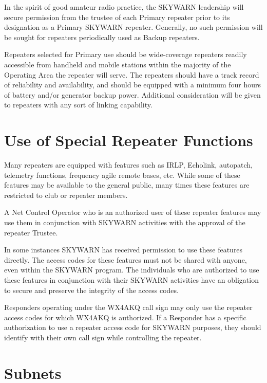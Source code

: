 \documentclass[pdflatex,letterpaper,twoside,12pt]{book}
\begin{document}
In the spirit of good amateur radio practice, the SKYWARN leadership will secure permission from the trustee of each Primary repeater prior to its designation as a Primary SKYWARN repeater.  Generally, no such permission will be sought for repeaters periodically used as Backup repeaters. 

Repeaters selected for Primary use should be wide-coverage repeaters readily accessible from handheld and mobile stations within the majority of the Operating Area the repeater will serve.  The repeaters should have a track record of reliability and availability, and should be equipped with a minimum four hours of battery and/or generator backup power.  Additional consideration will be given to repeaters with any sort of linking capability.


\section{Use of Special Repeater Functions}

Many repeaters are equipped with features such as IRLP, Echolink, autopatch, telemetry functions, frequency agile remote bases, etc.  While some of these features may be available to the general public, many times these features are restricted to club or repeater members. 

A Net Control Operator who is an authorized user of these repeater features may use them in conjunction with SKYWARN activities with the approval of the repeater Trustee. 

In some instances SKYWARN has received permission to use these features directly.  The access codes for these features must not be shared with anyone, even within the SKYWARN program.  The individuals who are authorized to use these features in conjunction with their SKYWARN activities have an obligation to secure and preserve the integrity of the access codes. 

Responders operating under the WX4AKQ call sign may only use the repeater access codes for which WX4AKQ is authorized.  If a Responder has a specific authorization to use a repeater access code for SKYWARN purposes, they should identify with their own call sign while controlling the repeater.


\section{Subnets}
\end{document}
